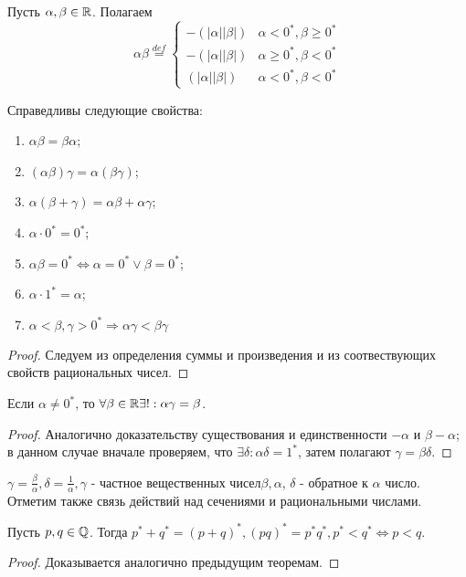 \documentclass[main]{subfiles}
\begin{document}
\begin{definition}
    Пусть $\alpha, \beta \in \mathbb{R}$. Полагаем
    \begin{equation*}
        \alpha\beta \stackrel{def}{=} 
        \begin{cases}
            -(|\alpha||\beta|) & \alpha < 0^*, \beta \geq 0^* \\
            -(|\alpha||\beta|) & \alpha \geq 0^*, \beta < 0^* \\
            (|\alpha||\beta|) & \alpha < 0^*, \beta < 0^*
        \end{cases}
    \end{equation*}
\end{definition}
\begin{theorem}
    Справедливы следующие свойства: 
    \begin{enumerate}
        \item $\alpha\beta = \beta\alpha$; 
        \item  $(\alpha\beta)\gamma = \alpha(\beta\gamma)$;
        \item $\alpha(\beta + \gamma) = \alpha\beta + \alpha\gamma$;
        \item $\alpha \cdot 0^* = 0^*$;
        \item $\alpha\beta = 0^* \Leftrightarrow \alpha = 0^* \vee \beta = 0^*$;
        \item $\alpha \cdot 1^* = \alpha$;
        \item $\alpha < \beta, \gamma > 0^* \Rightarrow \alpha\gamma < \beta\gamma$
    \end{enumerate}
\end{theorem}
\begin{proof}
    Следуем из определения суммы и произведения и из соотвествующих свойств
    рациональных чисел.
\end{proof}

\begin{theorem}
    Если $\alpha \neq 0^*$, то $\forall \beta \in \mathbb{R} \exists! : 
    \alpha\gamma = \beta$.
\end{theorem}
\begin{proof}
    Аналогично доказательству существования и единственности $-\alpha$ и 
    $\beta - \alpha$; в данном случае вначале проверяем, что $\exists \delta :
    \alpha\delta = 1^*$, затем полагают $\gamma = \beta\delta$.
\end{proof}

\begin{designation}
    $\gamma = \frac{\beta}{\alpha}, \delta = \frac{1}{\alpha}, \gamma 
    \text{ - частное вещественных чисел} \beta, \alpha$, $\delta$ - обратное к 
    $\alpha$ число. Отметим также связь действий над сечениями и рациональными 
    числами. 
\end{designation}
\begin{theorem}
    Пусть $p, q \in \mathbb{Q}$. Тогда $p^* + q^* = (p + q)^*, (pq)^* = p^*q^*, 
    p^* < q^* \Leftrightarrow p < q$.
\end{theorem}
\begin{proof}
    Доказывается аналогично предыдущим теоремам.
\end{proof}
\end{document}
